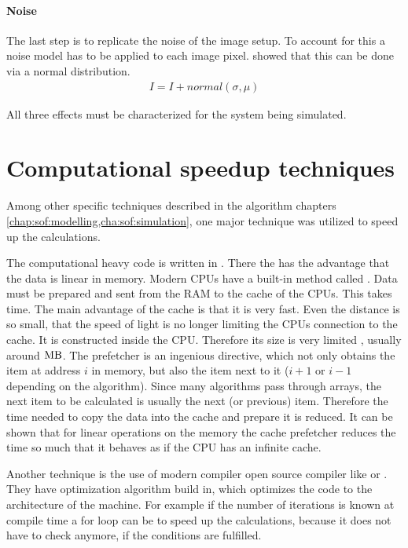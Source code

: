 \paragraph{Noise}
The last step is to replicate the noise of the image setup.
To account for this a noise model has to be applied to each image pixel.
\cite{Wiese:887678} showed that this can be done via a normal distribution.
% 
\begin{align}
    I = I + normal(\sigma, \mu)
\end{align}
% 
\par
% 
All three effects must be characterized for the system being simulated.
% 
% 
% 
\section{Computational speedup techniques}
% 
Among other specific techniques described in the algorithm chapters \cref{chap:sof:modelling,cha:sof:simulation}, one major technique was utilized to speed up the calculations.
\par
% 
The computational heavy code is written in \cpp{}.
There the  has the advantage that the data is linear in memory.
Modern \acp{CPU} have a built-in method called .
Data must be prepared and sent from the \ac{RAM} to the cache of the \acp{CPU}.
This takes time.
The main advantage of the cache is that it is very fast.
Even the distance is so small, that the speed of light is no longer limiting the  \acp{CPU} connection to the cache.
It is constructed inside the \ac{CPU}.
Therefore its size is very limited , usually around $\si{\mega\byte}$.
The prefetcher is an ingenious directive, which not only obtains the item at address $i$ in memory, but also the item next to it ($i+1$ or $i-1$ depending on the algorithm).
Since many algorithms pass through arrays, the next item to be calculated is usually the next (or previous) item.
Therefore the time needed to copy the data into the cache and prepare it is reduced.
It can be shown that for linear operations on the memory the cache prefetcher reduces the time so much that it behaves as if the \ac{CPU} has an infinite cache.
\par
% 
Another technique is the use of modern compiler open source compiler like  or .
They have optimization algorithm build in, which optimizes the code to the architecture of the machine.
For example if the number of iterations is known at compile time a for loop can be  to speed up the calculations, because it does not have to check anymore, if the conditions are fulfilled.